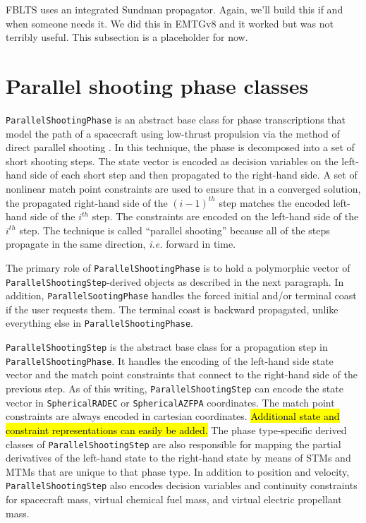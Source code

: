 FBLTS uses an integrated Sundman propagator. Again, we'll build this if and when someone needs it. We did this in EMTGv8 and it worked but was not terribly useful. This subsection is a placeholder for now.

\section{Parallel shooting phase classes}
\label{sec:parallel_shooting_phase}


\texttt{ParallelShootingPhase} is an abstract base class for phase transcriptions that model the path of a spacecraft using low-thrust propulsion via the method of direct parallel shooting \cite{enright1992}. In this technique, the phase is decomposed into a set of short shooting steps. The state vector is encoded as decision variables on the left-hand side of each short step and then propagated to the right-hand side. A set of nonlinear match point constraints are used to ensure that in a converged solution, the propagated right-hand side of the $(i-1)^{th}$ step matches the encoded left-hand side of the $i^{th}$ step. The constraints are encoded on the left-hand side of the $i^{th}$ step. The technique is called ``parallel shooting'' because all of the steps propagate in the same direction, \textit{i.e.} forward in time.

The primary role of \texttt{ParallelShootingPhase} is to hold a polymorphic vector of \texttt{ParallelShootingStep}-derived objects as described in the next paragraph. In addition, \texttt{ParallelSootingPhase} handles the forced initial and/or terminal coast if the user requests them. The terminal coast is backward propagated, unlike everything else in \texttt{ParallelShootingPhase}.

\texttt{ParallelShootingStep} is the abstract base class for a propagation step in \texttt{ParallelShootingPhase}. It handles the encoding of the left-hand side state vector and the match point constraints that connect to the right-hand side of the previous step. As of this writing, \texttt{ParallelShootingStep} can encode the state vector in \texttt{SphericalRADEC} or \texttt{SphericalAZFPA} coordinates. The match point constraints are always encoded in cartesian coordinates. \hl{Additional state and constraint representations can easily be added.} The phase type-specific derived classes of \texttt{ParallelShootingStep} are also responsible for mapping the partial derivatives of the left-hand state to the right-hand state by means of \ac{STM}s and \ac{MTM}s that are unique to that phase type. In addition to position and velocity, \texttt{ParallelShootingStep} also encodes decision variables and continuity constraints for spacecraft mass, virtual chemical fuel mass, and virtual electric propellant mass.

